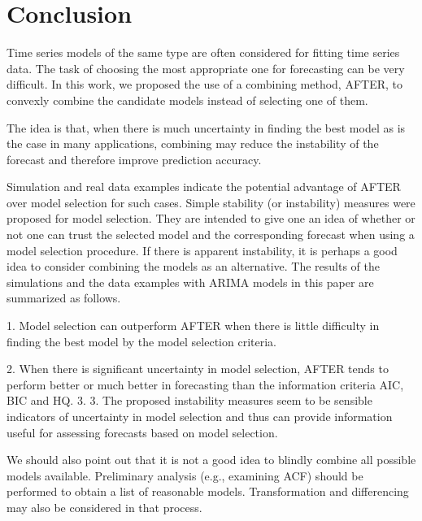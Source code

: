 \section{Conclusion}

Time series models of the same type are often considered for fitting time series data. The task of choosing the most appropriate one for forecasting can be very difficult. In this work, we proposed the use of a combining method, AFTER, to convexly combine the candidate models instead of selecting one of them.

The idea is that, when there is much uncertainty in finding the best model as is the case in many applications, combining may reduce the instability of the forecast and therefore improve prediction accuracy.

Simulation and real data examples indicate the potential advantage of AFTER over model selection for such cases. Simple stability (or instability) measures were proposed for model selection. They are intended to give one an idea of whether or not one can trust the selected model and the corresponding forecast when using a model selection procedure. If there is apparent instability, it is perhaps a good idea to consider combining the models as an alternative. The results of the simulations and the data examples with ARIMA models in this paper are summarized as follows.

1. Model selection can outperform AFTER when there is little difficulty in finding the best model by the model selection criteria. 

2. When there is significant uncertainty in model selection, AFTER tends to perform better or much better in forecasting than the information criteria AIC, BIC and HQ. 3.
3. The proposed instability measures seem to be sensible indicators of uncertainty in model selection and thus can provide information useful for assessing forecasts based on model selection.

We should also point out that it is not a good idea to blindly combine all possible models available. Preliminary analysis (e.g., examining ACF) should be performed to obtain a list of reasonable models. Transformation and differencing may also be considered in that process.

